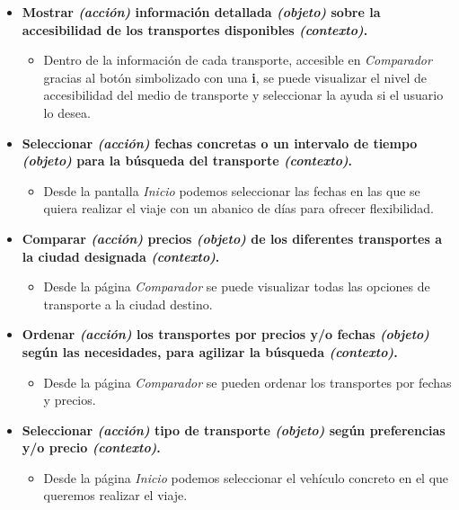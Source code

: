 \begin{itemize}
    \item \textbf{Mostrar \textit{(acción)} información detallada \textit{(objeto)} sobre la accesibilidad de los transportes 
        disponibles \textit{(contexto)}.}
        \begin{itemize}
            \item Dentro de la información de cada transporte, accesible en \textit{Comparador} gracias al botón simbolizado con una \textbf{i}, se puede visualizar el nivel de accesibilidad del medio de
                transporte y seleccionar la ayuda si el usuario lo desea.
        \end{itemize}




    \item \textbf{Seleccionar \textit{(acción)} fechas concretas o un intervalo de tiempo \textit{(objeto)} para la búsqueda del transporte \textit{(contexto)}.}
        \begin{itemize}
            \item Desde la pantalla \textit{Inicio} podemos seleccionar las fechas en las que se quiera realizar el viaje con un abanico de días para
                ofrecer flexibilidad.
        \end{itemize}

    \item \textbf{Comparar \textit{(acción)} precios \textit{(objeto)} de los diferentes transportes a la ciudad designada \textit{(contexto)}.}
        \begin{itemize}
            \item Desde la página \textit{Comparador} se puede visualizar todas las opciones de transporte a la ciudad destino.
        \end{itemize}

    \item \textbf{Ordenar \textit{(acción)} los transportes por precios y/o fechas \textit{(objeto)} según las necesidades, para agilizar la
        búsqueda \textit{(contexto)}.}
        \begin{itemize}
            \item Desde la página \textit{Comparador} se pueden ordenar los transportes por fechas y precios.
        \end{itemize}
    
    \item \textbf{Seleccionar \textit{(acción)} tipo de transporte \textit{(objeto)} según preferencias y/o precio \textit{(contexto)}.}
        \begin{itemize}
            \item Desde la página \textit{Inicio} podemos seleccionar el vehículo concreto en el que queremos realizar el viaje.
        \end{itemize}


\end{itemize}
